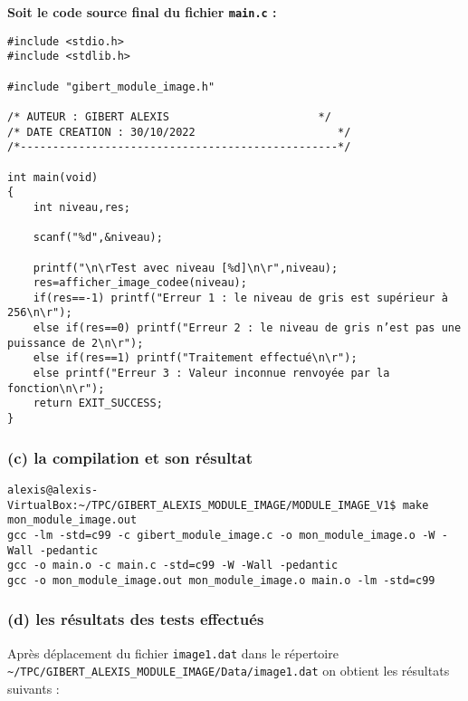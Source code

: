 \documentclass[11pt]{article}
\begin{document}
\textbf{Soit le code source final du fichier \texttt{main.c} :}

\begin{verbatim}
#include <stdio.h>
#include <stdlib.h>

#include "gibert_module_image.h"

/* AUTEUR : GIBERT ALEXIS                       */
/* DATE CREATION : 30/10/2022                      */
/*-------------------------------------------------*/

int main(void)
{
    int niveau,res;

    scanf("%d",&niveau);

    printf("\n\rTest avec niveau [%d]\n\r",niveau);
    res=afficher_image_codee(niveau);
    if(res==-1) printf("Erreur 1 : le niveau de gris est supérieur à 256\n\r");
    else if(res==0) printf("Erreur 2 : le niveau de gris n’est pas une puissance de 2\n\r");
    else if(res==1) printf("Traitement effectué\n\r");
    else printf("Erreur 3 : Valeur inconnue renvoyée par la fonction\n\r");
    return EXIT_SUCCESS;
}
\end{verbatim}

\subsubsection{(c) la compilation et son
résultat}\label{c-la-compilation-et-son-ruxe9sultat}

\begin{verbatim}
alexis@alexis-VirtualBox:~/TPC/GIBERT_ALEXIS_MODULE_IMAGE/MODULE_IMAGE_V1$ make mon_module_image.out
gcc -lm -std=c99 -c gibert_module_image.c -o mon_module_image.o -W -Wall -pedantic
gcc -o main.o -c main.c -std=c99 -W -Wall -pedantic
gcc -o mon_module_image.out mon_module_image.o main.o -lm -std=c99
\end{verbatim}

\subsubsection{(d) les résultats des tests
effectués}\label{d-les-ruxe9sultats-des-tests-effectuuxe9s}

Après déplacement du fichier \texttt{image1.dat} dans le répertoire
\texttt{\textasciitilde{}/TPC/GIBERT\_ALEXIS\_MODULE\_IMAGE/Data/image1.dat}
on obtient les résultats suivants :
\end{document}
